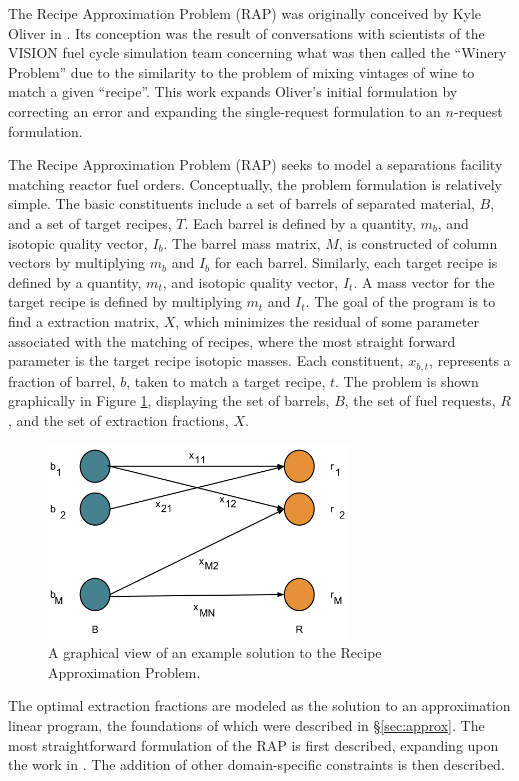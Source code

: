 The Recipe Approximation Problem (RAP) was originally conceived by Kyle Oliver
in \cite{oliver_geniusv2:_2009}. Its conception was the result of conversations
with scientists of the VISION fuel cycle simulation team \cite{vision2009}
concerning what was then called the ``Winery Problem'' due to the similarity to
the problem of mixing vintages of wine to match a given ``recipe''. This work
expands Oliver's initial formulation by correcting an error and expanding the
single-request formulation to an $n$-request formulation.

The Recipe Approximation Problem (RAP) seeks to model a separations facility
matching reactor fuel orders. Conceptually, the problem formulation is
relatively simple. The basic constituents include a set of barrels of separated
material, $B$, and a set of target recipes, $T$. Each barrel is defined by a
quantity, $m_b$, and isotopic quality vector, $I_b$. The barrel mass matrix,
$M$, is constructed of column vectors by multiplying $m_b$ and $I_b$ for each
barrel. Similarly, each target recipe is defined by a quantity, $m_t$, and
isotopic quality vector, $I_t$. A mass vector for the target recipe is defined
by multiplying $m_t$ and $I_t$. The goal of the program is to find a extraction
matrix, $X$, which minimizes the residual of some parameter associated with the
matching of recipes, where the most straight forward parameter is the target
recipe isotopic masses. Each constituent, $x_{b,t}$, represents a fraction of
barrel, $b$, taken to match a target recipe, $t$. The problem is shown
graphically in Figure \ref{fig:rap}, displaying the set of barrels, $B$, the set
of fuel requests, $R$, and the set of extraction fractions, $X$.

\begin{figure}[h]
  \begin{center}
    \includegraphics[width=8cm]{./chapters/research/rap.png}
  \caption{A graphical view of an example solution to the Recipe Approximation 
           Problem.}
  \label{fig:rap}
  \end{center}
\end{figure}

The optimal extraction fractions are modeled as the solution to an approximation
linear program, the foundations of which were described in
\S\ref{sec:approx}. The most straightforward formulation of the RAP is first
described, expanding upon the work in \cite{oliver_geniusv2:_2009}. The addition
of other domain-specific constraints is then described. 